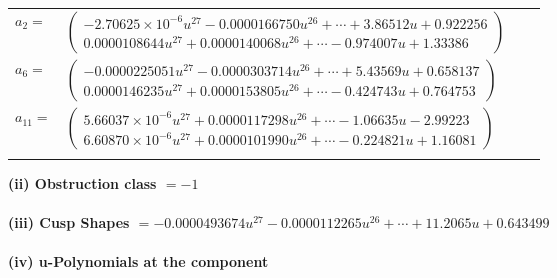\documentclass[1p]{elsarticle_modified}
\theoremstyle{definition}
\begin{document}
\begin{tabular}{m{7pt} m{180pt} m{7pt} m{180pt} }
\flushright $a_{2}=$&$\begin{pmatrix}-2.70625\times10^{-6} u^{27}-0.0000166750 u^{26}+\cdots+3.86512 u+0.922256\\0.0000108644 u^{27}+0.0000140068 u^{26}+\cdots-0.974007 u+1.33386\end{pmatrix}$ \\
\flushright $a_{6}=$&$\begin{pmatrix}-0.0000225051 u^{27}-0.0000303714 u^{26}+\cdots+5.43569 u+0.658137\\0.0000146235 u^{27}+0.0000153805 u^{26}+\cdots-0.424743 u+0.764753\end{pmatrix}$ \\
\flushright $a_{11}=$&$\begin{pmatrix}5.66037\times10^{-6} u^{27}+0.0000117298 u^{26}+\cdots-1.06635 u-2.99223\\6.60870\times10^{-6} u^{27}+0.0000101990 u^{26}+\cdots-0.224821 u+1.16081\end{pmatrix}$\\&\end{tabular}
\flushleft \textbf{(ii) Obstruction class $= -1$}\\~\\
\flushleft \textbf{(iii) Cusp Shapes $= -0.0000493674 u^{27}-0.0000112265 u^{26}+\cdots+11.2065 u+0.643499$}\\~\\
\newpage\renewcommand{\arraystretch}{1}
\flushleft \textbf{(iv) u-Polynomials at the component}\newline \\
\end{document}

